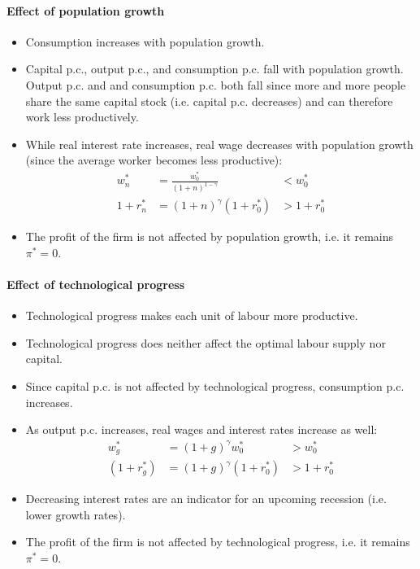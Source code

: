 \documentclass[a4paper,landscape,7pt,fleqn]{scrartcl}
\begin{document}
\begin{multicols*}{3}
\paragraph{Effect of population growth}

\begin{itemize}
\item Consumption increases with population growth.
\item Capital p.c., output p.c., and consumption p.c. fall with population growth. \\
Output p.c. and and consumption p.c. both fall since more and more people share the same capital stock (i.e. capital p.c. decreases) and can therefore work less productively.
\item While real interest rate increases, real wage decreases with population growth (since the average worker becomes less productive):
\begin{align*}
w_n^\ast &= \frac{w_0^\ast}{(1+n)^{1-\gamma}} & < w_0^\ast \\
1 + r_n^\ast &= (1+n)^\gamma (1+r_0^\ast) & > 1+r_0^\ast
\end{align*}
\item The profit of the firm is not affected by population growth, i.e. it remains $\pi^\ast = 0$.
\end{itemize}

\paragraph{Effect of technological progress}

\begin{itemize}
\item Technological progress makes each unit of labour more productive.
\item Technological progress does neither affect the optimal labour supply nor capital.
\item Since capital p.c. is not affected by technological progress, consumption p.c. increases.
\item As output p.c. increases, real wages and interest rates increase as well:
\begin{align*}
w_g^\ast &= (1+g)^\gamma w_0^\ast & > w_0^\ast \\
(1+r_g^\ast) &= (1+g)^\gamma (1+r_0^\ast) & > 1+r_0^\ast
\end{align*}
\item Decreasing interest rates are an indicator for an upcoming recession (i.e. lower growth rates).
\item The profit of the firm is not affected by technological progress, i.e. it remains $\pi^\ast = 0$.
\end{itemize}


\end{multicols*}
\end{document}

